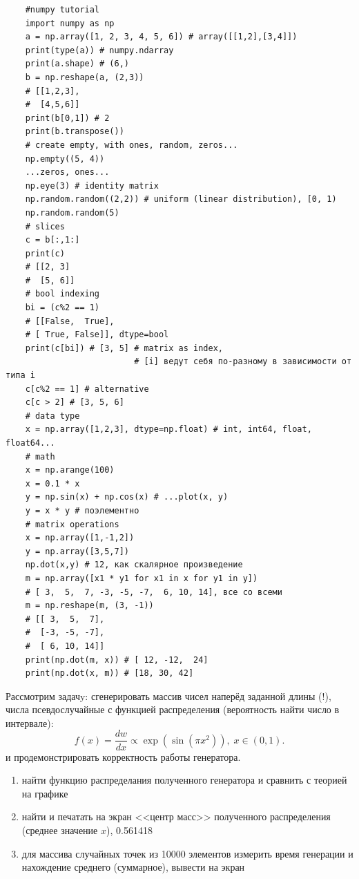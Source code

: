 \documentclass{book}
\begin{document}
\begin{verbatim}
    #numpy tutorial
    import numpy as np
    a = np.array([1, 2, 3, 4, 5, 6]) # array([[1,2],[3,4]])
    print(type(a)) # numpy.ndarray
    print(a.shape) # (6,)
    b = np.reshape(a, (2,3))
    # [[1,2,3],
    #  [4,5,6]]
    print(b[0,1]) # 2
    print(b.transpose())
    # create empty, with ones, random, zeros...
    np.empty((5, 4))
    ...zeros, ones...
    np.eye(3) # identity matrix
    np.random.random((2,2)) # uniform (linear distribution), [0, 1)
    np.random.random(5)
    # slices
    c = b[:,1:]
    print(c)
    # [[2, 3]
    #  [5, 6]]
    # bool indexing
    bi = (c%2 == 1)
    # [[False,  True],
    # [ True, False]], dtype=bool
    print(c[bi]) # [3, 5] # matrix as index,
                          # [i] ведут себя по-разному в зависимости от типа i
    c[c%2 == 1] # alternative
    c[c > 2] # [3, 5, 6]
    # data type
    x = np.array([1,2,3], dtype=np.float) # int, int64, float, float64...
    # math
    x = np.arange(100)
    x = 0.1 * x
    y = np.sin(x) + np.cos(x) # ...plot(x, y)
    y = x * y # поэлементно
    # matrix operations
    x = np.array([1,-1,2])
    y = np.array([3,5,7])
    np.dot(x,y) # 12, как скалярное произведение
    m = np.array([x1 * y1 for x1 in x for y1 in y])
    # [ 3,  5,  7, -3, -5, -7,  6, 10, 14], все со всеми
    m = np.reshape(m, (3, -1))
    # [[ 3,  5,  7],
    #  [-3, -5, -7],
    #  [ 6, 10, 14]]
    print(np.dot(m, x)) # [ 12, -12,  24]
    print(np.dot(x, m)) # [18, 30, 42]
\end{verbatim}


Рассмотрим
задачy: сгенерировать массив чисел наперёд заданной длины (!), числа псевдослучайные
с функцией распределения (вероятность найти число в интервале):
\begin{equation}
    f(x) = \frac{dw}{dx} \propto \exp(\sin(\pi x^2)),\; x \in (0, 1).
\end{equation}
и продемонстрировать корректность работы генератора.
\begin{enumerate}
  \item найти функцию распределания полученного генератора и сравнить с теорией
      на графике %
  \item найти и печатать на экран <<центр масс>> полученного
      распределения (среднее значение $x$), 0.561418%
  \item для массива случайных точек из 10000 элементов измерить время генерации
      и нахождение среднего (суммарное), вывести на экран %
\end{enumerate}
\end{document}
